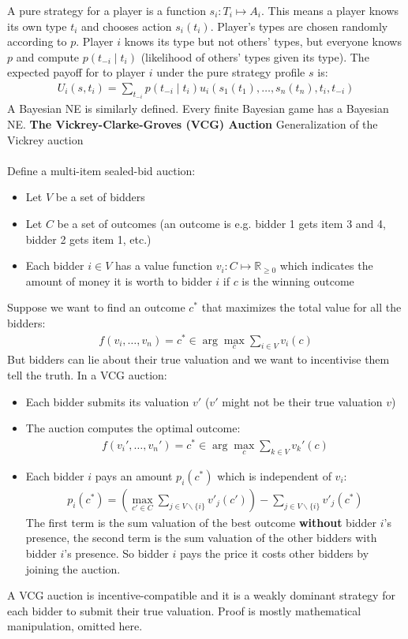 \documentclass{article}
\begin{document}
A pure strategy for a player is a function $s_i: T_i\mapsto A_i$. This means a player knows its own type $t_i$ and chooses action $s_i(t_i)$. Player's types are chosen randomly according to $p$. Player $i$ knows its type but not others' types, but everyone knows $p$ and compute $p(t_{-i}\mid t_i)$ (likelihood of others' types given its type). The expected payoff for to player $i$ under the pure strategy profile $s$ is:
\begin{align*}
U_i(s, t_i) = \sum_{t_{-i}} p(t_{-i}\mid t_i)u_i(s_1(t_1),\ldots, s_n(t_n), t_i, t_{-i})
\end{align*}
A Bayesian NE is similarly defined. Every finite Bayesian game has a Bayesian NE. 
\newpage
\textbf{The Vickrey-Clarke-Groves (VCG) Auction}
Generalization of the Vickrey auction
\\~\\
Define a multi-item sealed-bid auction:
\begin{itemize}
\item Let $V$ be a set of bidders
\item Let $C$ be a set of outcomes (an outcome is e.g. bidder 1 gets item 3 and 4, bidder 2 gets item 1, etc.)
\item Each bidder $i \in V$ has a value function $v_i:C\mapsto \mathbb{R}_{\ge 0}$ which indicates the amount of money it is worth to bidder $i$ if $c$ is the winning outcome
\end{itemize}
Suppose we want to find an outcome $c^*$ that maximizes the total value for all the bidders:
\begin{align*}
f(v_i,\ldots,v_n) = c^* \in \arg \max_c \sum_{i\in V} v_i(c)
\end{align*}
But bidders can lie about their true valuation and we want to incentivise them tell the truth. In a VCG auction:
\begin{itemize}
\item Each bidder submits its valuation $v'$ ($v'$ might not be their true valuation $v$)
\item The auction computes the optimal outcome:
\begin{align*}
	f(v_i',\ldots,v_n') = c^* \in \arg \max_c \sum_{k\in V} v_k'(c)
\end{align*}
\item Each bidder $i$ pays an amount $p_i(c^*)$ which is independent of $v_i$:
\begin{align*}
p_i(c^*) = \left( \max_{c'\in C} \sum_{j\in V\backslash \{i\}}  v'_j(c')\right) - \sum_{j\in V\backslash \{i\}}  v'_j(c^*)
\end{align*}
The first term is the sum valuation of the best outcome \textbf{without} bidder $i$'s presence, the second term is the sum valuation of the other bidders with bidder $i$'s presence. So bidder $i$ pays the price it costs other bidders by joining the auction.
\end{itemize}
A VCG auction is incentive-compatible and it is a weakly dominant strategy for each bidder to submit their true valuation. Proof is mostly mathematical manipulation, omitted here.
\end{document}
